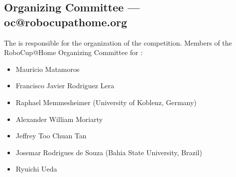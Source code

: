 \subsection{Organizing Committee --- oc@robocupathome.org}
\label{sec:oc}
The  is responsible for the organization of the competition. Members of the RoboCup@Home Organizing Committee for \YEAR:

\begin{itemize}
  \item Mauricio Matamoros 
  \item Francisco Javier Rodriguez Lera 
  \item Raphael Memmesheimer (University of Koblenz, Germany)
  \item Alexander William Moriarty 
  \item Jeffrey Too Chuan Tan 
  \item Josemar Rodrigues de Souza (Bahia State University, Brazil)
  \item Ryuichi Ueda
\end{itemize}
